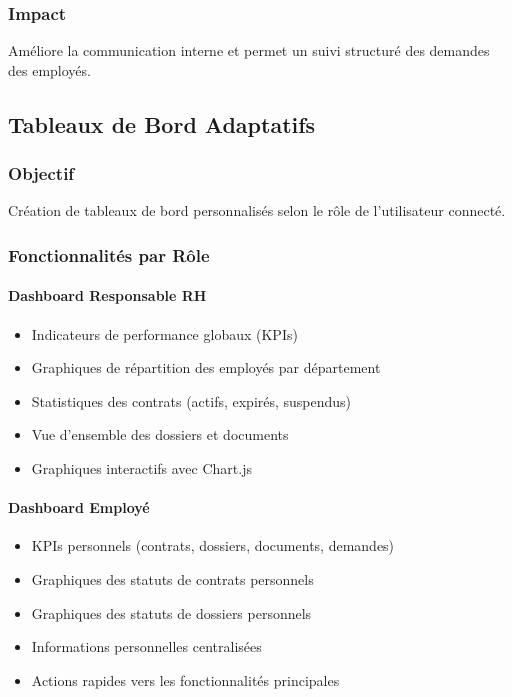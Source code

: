 \documentclass[12pt,a4paper]{article}
\begin{document}
\subsubsection{Impact}
Améliore la communication interne et permet un suivi structuré des demandes des employés.

\subsection{Tableaux de Bord Adaptatifs}

\subsubsection{Objectif}
Création de tableaux de bord personnalisés selon le rôle de l'utilisateur connecté.

\subsubsection{Fonctionnalités par Rôle}

\paragraph{Dashboard Responsable RH}
\begin{itemize}
    \item Indicateurs de performance globaux (KPIs)
    \item Graphiques de répartition des employés par département
    \item Statistiques des contrats (actifs, expirés, suspendus)
    \item Vue d'ensemble des dossiers et documents
    \item Graphiques interactifs avec Chart.js
\end{itemize}

\paragraph{Dashboard Employé}
\begin{itemize}
    \item KPIs personnels (contrats, dossiers, documents, demandes)
    \item Graphiques des statuts de contrats personnels
    \item Graphiques des statuts de dossiers personnels
    \item Informations personnelles centralisées
    \item Actions rapides vers les fonctionnalités principales
\end{itemize}
\end{document}
